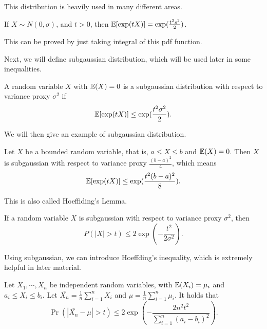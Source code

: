 \documentclass[../main.tex]{subfiles}
\begin{document}
This distribution is heavily used in many different areas.

\begin{fact}
	If $X \sim N(0, \sigma)$, and $t > 0$, then $\mathbb{E}[\exp(tX)] = \exp(\frac{t^2s^2}{2})$.
\end{fact}

This can be proved by just taking integral of this pdf function.

Next, we will define subgaussian distribution, which will be used later in some inequalities.

\begin{definition}
	A random variable $X$ with $\mathbb{E}(X) = 0$ is a subgaussian distribution with respect to variance proxy $\sigma^2$ if 
	\begin{equation}
		\mathbb{E}[\exp(tX)] \leq \exp(\frac{t^2\sigma^2}{2}).
	\end{equation}
\end{definition}

We will then give an example of subgaussian distribution.

\begin{example}
	Let $X$ be a bounded random variable, that is, $a \leq X \leq b$ and $\mathbb{E}(X) = 0$. Then $X$ is subgaussian with respect to variance proxy $\frac{(b-a)^2}{4}$, which means
	\begin{equation*}
		\mathbb{E}[\exp(tX)] \leq \exp(\frac{t^2(b-a)^2}{8}).
	\end{equation*}
\end{example}

This is also called Hoeffiding's Lemma.

\begin{claim}
	If a random variable $X$ is subgaussian with respect to variance proxy $\sigma^2$, then 
	\begin{equation}
	 	P(|X|> t) \leq 2\exp(-\frac{t^2}{2\sigma^2}). 
	\end{equation}
\end{claim}

Using subgaussian, we can introduce Hoeffding's inequality, which is extremely helpful in later material.

\begin{theorem}
	Let $X_1, \cdots ,X_n$ be independent random variables, with $\mathbb{E}(X_i) = \mu_i$ and $a_i \leq X_i \leq b_i$. Let $\bar{X_n} = \frac{1}{n} \sum\limits_{i=1}^n X_i$ and $\mu  = \frac{1}{n}  \sum\limits_{i=1}^n \mu_i$. It holds that 
	\begin{equation}
		\Pr(|\bar{X_n} - \mu| > t) \leq 2 \exp(-\frac{2n^2t^2}{\sum\limits_{i=1}^n (a_i - b_i)^2}).
	\end{equation}
\end{theorem}
\end{document}
